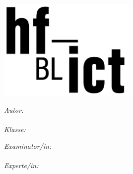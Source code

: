 

\begin{titlepage}

\setlength{\parskip}{0pt}

\begin{center}
\includegraphics[width=0.5\textwidth]{Bilder/hf-ict-Logo}

\vspace{0.5cm}
{\color{black}\LARGE \univnameger\par}                %
\vspace{0.3cm}

\vspace{1.5cm}                            
{\LARGE \ttype\par}                                             %
\vspace{0.2cm}
\HRule 
\vspace{0.2cm}
{\huge \bfseries \ttitle\par}                                   %
\vspace{0.2cm}  
\HRule
\vspace{1.0cm}

\begin{minipage}[t]{0.4\textwidth}
\begin{flushleft} 
    \large
    \emph{Autor:}\\
    \authorname\\
    \vspace{0.5cm}
    \emph{Klasse:}\\
    \authcls
\end{flushleft}
\end{minipage}
\begin{minipage}[t]{0.4\textwidth}
\begin{flushright} 
    \large
    \emph{Examinator/in:} \\
    \supnameA \\
    \vspace{0.5cm}
    \emph{Experte/in:} \\
    \supnameB \\
\end{flushright}
\end{minipage}


\end{center}
\end{titlepage}

